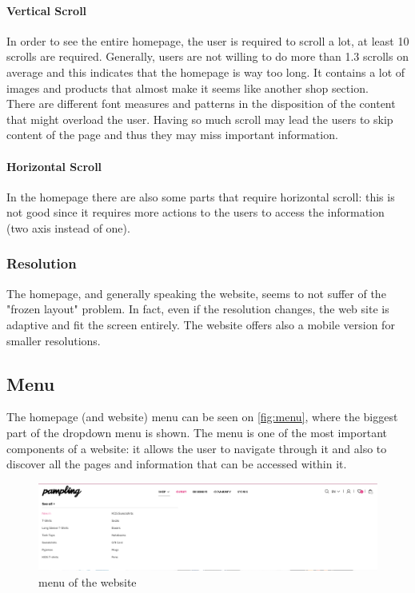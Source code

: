 \paragraph{Vertical Scroll}
In order to see the entire homepage, the user is required to scroll a lot, at least 10 scrolls are required. 
Generally, users are not willing to do more than 1.3 scrolls on average and this indicates that the homepage is way too long.
It contains a lot of images and products that almost make it seems like another shop section.\\
There are different font measures and patterns in the disposition of the content that might overload the user.
Having so much scroll may lead the users to skip content of the page and thus they may miss important information.

\paragraph{Horizontal Scroll}
In the homepage there are also some parts that require horizontal scroll: this is not good since it requires more actions to the users
to access the information (two axis instead of one).

\subsubsection{Resolution}
The homepage, and generally speaking the website, seems to not suffer of the "frozen layout" problem. 
In fact, even if the resolution changes, the web site is adaptive and fit the screen entirely. 
The website offers also a mobile version for smaller resolutions.


\subsection{Menu}
The homepage (and website) menu can be seen on \cref{fig:menu}, where the biggest part of the dropdown menu is shown. 
The menu is one of the most important components of a website: it allows the user to navigate through it and 
also to discover all the pages and information that can be accessed within it.

\begin{figure}[h!]
	\centering
	\includegraphics[scale=0.225]{images/menu.png}
	\caption{menu of the website}
	\label{fig:blog-users}
\end{figure}

